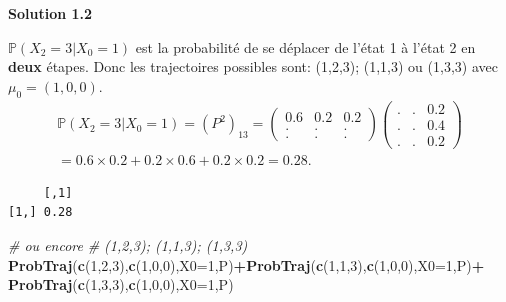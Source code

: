 \documentclass[
]{book}
\newenvironment{Shaded}{\begin{snugshade}}{\end{snugshade}}
\newcommand{\CommentTok}[1]{\textcolor[rgb]{0.56,0.35,0.01}{\textit{#1}}}
\newcommand{\DataTypeTok}[1]{\textcolor[rgb]{0.13,0.29,0.53}{#1}}
\newcommand{\DecValTok}[1]{\textcolor[rgb]{0.00,0.00,0.81}{#1}}
\newcommand{\FloatTok}[1]{\textcolor[rgb]{0.00,0.00,0.81}{#1}}
\newcommand{\KeywordTok}[1]{\textcolor[rgb]{0.13,0.29,0.53}{\textbf{#1}}}
\newcommand{\NormalTok}[1]{#1}
\newcommand{\OperatorTok}[1]{\textcolor[rgb]{0.81,0.36,0.00}{\textbf{#1}}}
\newcommand{\StringTok}[1]{\textcolor[rgb]{0.31,0.60,0.02}{#1}}
\theoremstyle{definition}
\theoremstyle{definition}
\theoremstyle{definition}
\theoremstyle{remark}
\begin{document}
\textbf{Solution 1.2}

\(\mathbb{P}(X_2=3|X_0=1)\) est la probabilité de se déplacer de l'état 1 à l'état 2 en \textbf{deux} étapes. Donc les trajectoires possibles sont: (1,2,3); (1,1,3) ou (1,3,3) avec \(\mu_0=(1,0,0)\).
\begin{align*}
\mathbb{P}(X_2=3|X_0=1)= \left( P^2\right)_{13} =\left( 
  \begin{array}{ccc}
0.6 & 0.2 & 0.2 \\
. & . & . \\
. & . & .
\end{array}
\right)\left( 
  \begin{array}{ccc}
. & . & 0.2 \\
. & . & 0.4 \\
. & . & 0.2
\end{array}
\right)\\
= 0.6 \times 0.2 + 0.2 \times 0.6 +0.2 \times 0.2 = 0.28.
\end{align*}

\begin{Shaded}
\end{Shaded}

\begin{verbatim}
     [,1]
[1,] 0.28
\end{verbatim}

\begin{Shaded}
\begin{Highlighting}[]
\CommentTok{# ou encore}
\CommentTok{# (1,2,3); (1,1,3); (1,3,3)}
\KeywordTok{ProbTraj}\NormalTok{(}\KeywordTok{c}\NormalTok{(}\DecValTok{1}\NormalTok{,}\DecValTok{2}\NormalTok{,}\DecValTok{3}\NormalTok{),}\KeywordTok{c}\NormalTok{(}\DecValTok{1}\NormalTok{,}\DecValTok{0}\NormalTok{,}\DecValTok{0}\NormalTok{),}\DataTypeTok{X0=}\DecValTok{1}\NormalTok{,P)}\OperatorTok{+}\KeywordTok{ProbTraj}\NormalTok{(}\KeywordTok{c}\NormalTok{(}\DecValTok{1}\NormalTok{,}\DecValTok{1}\NormalTok{,}\DecValTok{3}\NormalTok{),}\KeywordTok{c}\NormalTok{(}\DecValTok{1}\NormalTok{,}\DecValTok{0}\NormalTok{,}\DecValTok{0}\NormalTok{),}\DataTypeTok{X0=}\DecValTok{1}\NormalTok{,P)}\OperatorTok{+}
\StringTok{  }\KeywordTok{ProbTraj}\NormalTok{(}\KeywordTok{c}\NormalTok{(}\DecValTok{1}\NormalTok{,}\DecValTok{3}\NormalTok{,}\DecValTok{3}\NormalTok{),}\KeywordTok{c}\NormalTok{(}\DecValTok{1}\NormalTok{,}\DecValTok{0}\NormalTok{,}\DecValTok{0}\NormalTok{),}\DataTypeTok{X0=}\DecValTok{1}\NormalTok{,P)}
\end{Highlighting}
\end{Shaded}
\end{document}
